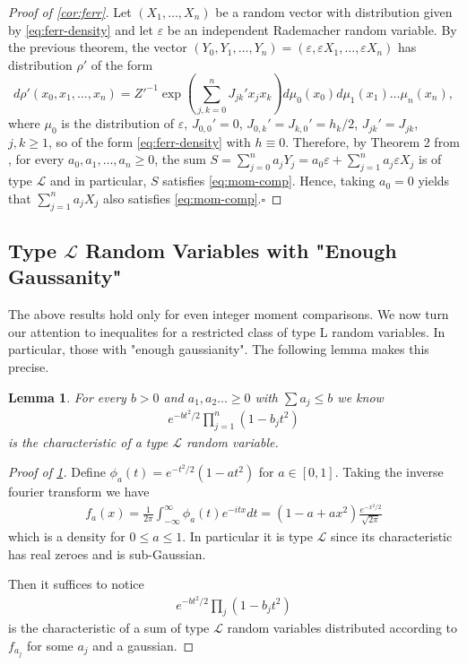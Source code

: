 \documentclass[10pt]{article}
\newcommand{\e}{\varepsilon}
\newcommand{\1}{\textbf{1}}
\newcommand{\sL}{\mathcal{L}}
\newtheorem{lemma}{Lemma}[subsection]
\theoremstyle{remark}
\theoremstyle{definition}
\begin{document}
\begin{proof}[Proof of \ref{cor:ferr}]
	Let $(X_1, \ldots, X_n)$ be a random vector with distribution given by \eqref{eq:ferr-density} and let $\varepsilon$ be an independent Rademacher random variable. By the previous theorem, the vector $(Y_0,Y_1,\dots,Y_n) = (\e,\e X_1,\dots,\e X_n)$ has distribution $\rho'$ of the form
\[
d\rho'(x_0,x_1,\ldots,x_n) = Z'^{-1}\exp\left(\sum_{j,k=0}^n J_{jk}'x_jx_k\right)d\mu_0(x_0)d\mu_1(x_1)\dots\mu_n(x_n),
\]
where $\mu_0$ is the distribution of $\varepsilon$, $J_{0,0}' = 0$, $J_{0,k}' = J_{k,0}'= h_k/2$, $J_{jk}' = J_{jk}$, $j,k \geq 1$, so of the form \eqref{eq:ferr-density} with $h \equiv 0$. Therefore, by Theorem 2 from \cite{N}, for every $a_0, a_1,\dots, a_n \geq 0$, the sum $S = \sum_{j=0}^n a_jY_j = a_0\e + \sum_{j=1}^n a_j\e X_j$ is of type $\sL$ and in particular, $S$ satisfies \eqref{eq:mom-comp}. Hence, taking $a_0 = 0$ yields that $\sum_{j=1}^n a_jX_j$ also satisfies \eqref{eq:mom-comp}.\hfill$\square$
\end{proof}

\subsection{Type $\mathcal{L}$ Random Variables with "Enough Gaussanity"}

The above results hold only for even integer moment comparisons. We now turn our attention to inequalites for a restricted class of type L random variables. In particular, those with "enough gaussianity". The following lemma makes this precise.

\begin{lemma}\label{lem:L1}
	For every $b > 0$ and $a_1,a_2...\geq 0$ with $\sum a_j \leq b$ we know
	\begin{align*}
		e^{-bt^2/2}\prod_{j=1}^n (1-b_jt^2)
	\end{align*} 
	is the characteristic of a type $\mathcal{L}$ random variable. 
\end{lemma}

\begin{proof}[Proof of \ref{lem:L1}]
	Define $\phi_a(t) = e^{-t^2/2}(1-at^2)$ for $a \in [0,1]$. Taking the inverse fourier transform we have
	\begin{align*}
		f_a(x) = \frac{1}{2\pi}\int_{-\infty}^{\infty}\phi_a(t)e^{-itx}dt = (1-a+ax^2)\frac{e^{-x^2/2}}{\sqrt{2\pi}}
	\end{align*}
	which is a density for $0 \leq a \leq 1$. In particular it is type $\mathcal{L}$ since its characteristic has real zeroes and is sub-Gaussian.

	Then it suffices to notice 
	\begin{align*}
		e^{-bt^2/2}\prod_j (1-b_jt^2)
	\end{align*} 
	is the characteristic of a sum of type $\mathcal{L}$ random variables distributed according to $f_{a_j}$ for some $a_j$ and a gaussian. 
\end{proof}
\end{document}

